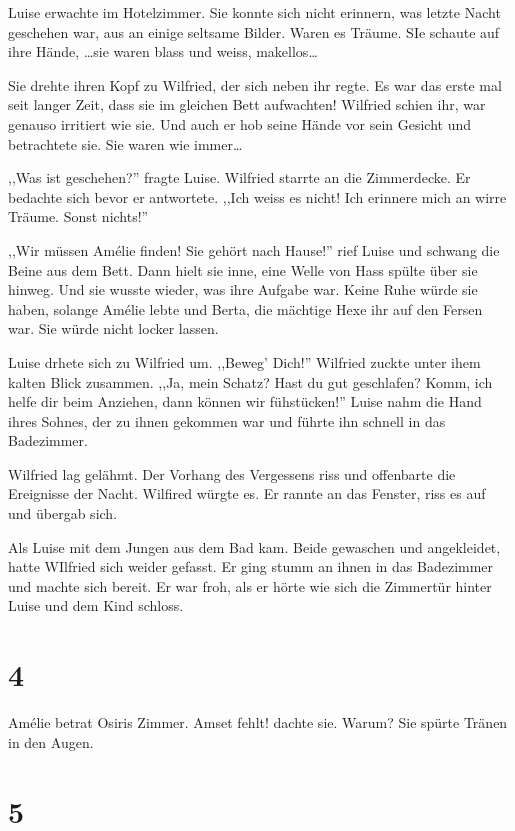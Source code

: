 Luise erwachte im Hotelzimmer. Sie konnte sich nicht erinnern, was letzte Nacht geschehen war, aus an einige seltsame Bilder. Waren es Träume. SIe schaute auf ihre Hände, \dots sie waren blass und weiss, makellos\dots

Sie drehte ihren Kopf zu Wilfried, der sich neben ihr regte. Es war das erste mal seit langer Zeit, dass sie im gleichen Bett aufwachten! Wilfried schien ihr, war genauso irritiert wie sie. Und auch er hob seine Hände vor sein Gesicht und betrachtete sie. Sie waren wie immer\dots

,,Was ist geschehen?'' fragte Luise. Wilfried starrte an die Zimmerdecke. Er bedachte sich bevor er antwortete. ,,Ich weiss es nicht! Ich erinnere mich an wirre Träume. Sonst nichts!''

,,Wir müssen Amélie finden! Sie gehört nach Hause!'' rief Luise und schwang die Beine aus dem Bett. Dann hielt sie inne, eine Welle von Hass spülte über sie hinweg. Und sie wusste wieder, was ihre Aufgabe war. Keine Ruhe würde sie haben, solange Amélie lebte und Berta, die mächtige Hexe ihr auf den Fersen war. Sie würde nicht locker lassen.

Luise drhete sich zu Wilfried um. ,,Beweg' Dich!'' Wilfried zuckte unter ihem kalten Blick zusammen. ,,Ja, mein Schatz? Hast du gut geschlafen? Komm, ich helfe dir beim Anziehen, dann können wir fühstücken!'' Luise nahm die Hand ihres Sohnes, der zu ihnen gekommen war und führte ihn schnell in das Badezimmer.

Wilfried lag gelähmt. Der Vorhang des Vergessens riss und offenbarte die Ereignisse der Nacht. Wilfired würgte es. Er rannte an das Fenster, riss es auf und übergab sich. 

Als Luise mit dem Jungen aus dem Bad kam. Beide gewaschen und angekleidet, hatte WIlfried sich weider gefasst. Er ging stumm an ihnen in das Badezimmer und machte sich bereit. Er war froh, als er hörte wie sich die Zimmertür hinter Luise und dem Kind schloss.



\section*{4}

Amélie betrat Osiris Zimmer. Amset fehlt! dachte sie. Warum? Sie spürte Tränen in den Augen. 

\section*{5}

